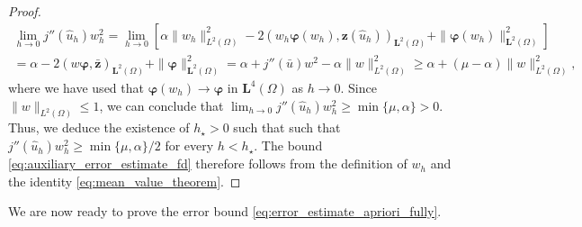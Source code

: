 \documentclass[final]{siamart0216}
\begin{document}
\begin{proof}
\begin{multline*}
\lim_{h\to 0}j''(\hat{u}_h)w_h^2
=
\lim_{h\to 0}
\left[
\alpha\|w_h\|_{L^2(\Omega)}^2-2(w_h\boldsymbol{\varphi}(w_h),\mathbf{z}(\hat{u}_h))_{\mathbf{L}^2(\Omega)}+\|\boldsymbol{\varphi}(w_h)\|_{\mathbf{L}^2(\Omega)}^2
\right]
\\
=\alpha-2(w\boldsymbol{\varphi},\bar{\mathbf{z}})_{\mathbf{L}^2(\Omega)}+\|\boldsymbol{\varphi}\|_{\mathbf{L}^2(\Omega)}^2=\alpha+j''(\bar{u})w^2-\alpha \|w\|_{L^2(\Omega)}^2\geq \alpha + (\mu-\alpha) \|w\|_{L^2(\Omega)}^2,
\end{multline*}
where we have used that $\boldsymbol{\varphi}(w_h)\rightarrow \boldsymbol{\varphi}$ in $\mathbf{L}^4(\Omega)$ as $h \rightarrow 0$. Since $\|w\|_{L^2(\Omega)}\leq 1$, we can conclude that $\lim_{h\rightarrow 0}j''(\hat{u}_h)w_h^2\geq \min\{\mu,\alpha\}>0$. Thus, we deduce the existence of $h_{\star}>0$ such that such that $j''(\hat{u}_h)w_h^2\geq \min\{\mu,\alpha\}/2$ for every $h<h_{\star}$. The bound \eqref{eq:auxiliary_error_estimate_fd} therefore follows from the definition of $w_h$ and the identity \eqref{eq:mean_value_theorem}.
\end{proof}

We are now ready to prove the error bound \eqref{eq:error_estimate_apriori_fully}.
\end{document}
